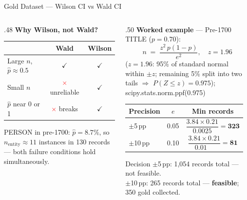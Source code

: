 \documentclass[xcolor,aspectratio=169,compress]{beamer}
\begin{document}
\begin{frame}{Gold Dataset --- Wilson CI vs Wald CI}
  \small
  \begin{columns}
    \begin{column}{.48\textwidth}
      \textbf{Why Wilson, not Wald?}
      \begin{center}\footnotesize
      \begin{tabular}{lcc}
        \toprule
         & Wald & Wilson \\
        \midrule
        Large $n$, $\hat{p}\approx0.5$ & \textcolor{green!60!black}{$\checkmark$} & \textcolor{green!60!black}{$\checkmark$} \\
        Small $n$                       & \textcolor{red}{$\times$} unreliable & \textcolor{green!60!black}{$\checkmark$} \\
        $\hat{p}$ near 0 or 1           & \textcolor{red}{$\times$} breaks     & \textcolor{green!60!black}{$\checkmark$} \\
        \bottomrule
      \end{tabular}
      \end{center}
      \smallskip
      PERSON in pre-1700: $\hat{p}=8.7\%$, so $n_{\text{entity}}\approx11$ instances in 130 records
      --- both failure conditions hold simultaneously.
    \end{column}
    \begin{column}{.50\textwidth}
      \textbf{Worked example} --- Pre-1700 TITLE ($p=0.70$):
      \[
        n \;=\; \frac{z^{2}\,p(1-p)}{e^{2}}, \quad z=1.96
      \]
      \footnotesize($z=1.96$: 95\% of standard normal within $\pm z$; remaining 5\% split into two tails $\Rightarrow$ $P(Z\leq z)=0.975$); scipy.stats.norm.ppf(0.975)
      \smallskip
      \begin{center}\footnotesize
      \begin{tabular}{lcc}
        \toprule
        Precision & $e$ & Min records \\
        \midrule
        $\pm$5\,pp  & 0.05 & $\dfrac{3.84\times0.21}{0.0025}=\mathbf{323}$ \\[6pt]
        $\pm$10\,pp & 0.10 & $\dfrac{3.84\times0.21}{0.01\phantom{00}}=\mathbf{81}$ \\
        \bottomrule
      \end{tabular}
      \end{center}
      \smallskip
      \begin{alertblock}{Decision}
        $\pm$5\,pp: 1,054 records total --- not feasible. \\
        $\pm$10\,pp: 265 records total --- \textbf{feasible}; 350 gold collected.
      \end{alertblock}
    \end{column}
  \end{columns}
\end{frame}
\end{document}
